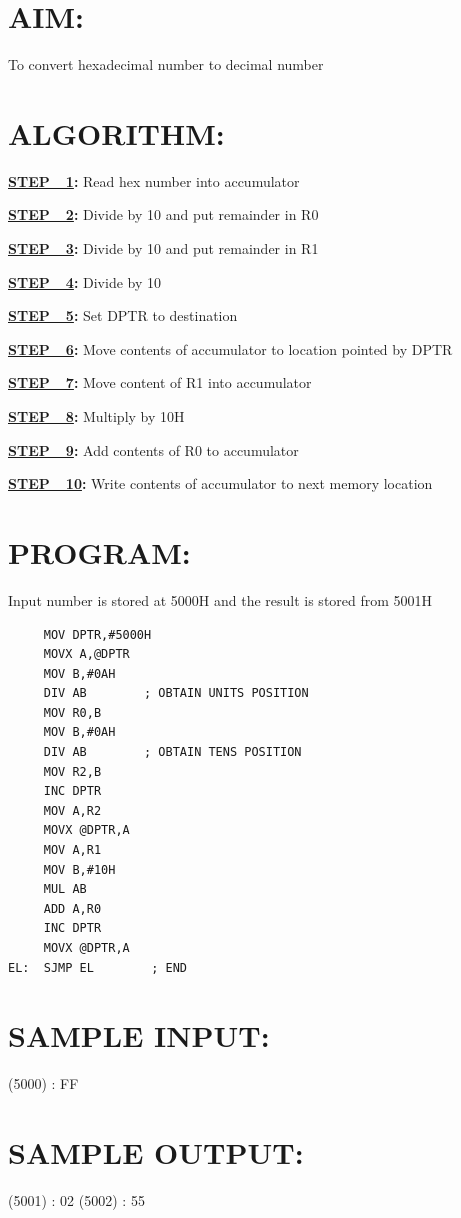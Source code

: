 \documentclass[a4paper,28pt]{report}
\begin{document}
\section*{AIM:}
To convert hexadecimal number to decimal number

\section*{ALGORITHM:}
\textbf{\underline{STEP\ \ 1}:} Read hex number into accumulator

\textbf{\underline{STEP\ \ 2}:} Divide by 10 and put remainder in R0

\textbf{\underline{STEP\ \ 3}:} Divide by 10 and put remainder in R1

\textbf{\underline{STEP\ \ 4}:} Divide by 10

\textbf{\underline{STEP\ \ 5}:} Set DPTR to destination

\textbf{\underline{STEP\ \ 6}:} Move contents of accumulator to location pointed by DPTR

\textbf{\underline{STEP\ \ 7}:} Move content of R1 into accumulator

\textbf{\underline{STEP\ \ 8}:} Multiply by 10H

\textbf{\underline{STEP\ \ 9}:} Add contents of R0 to accumulator

\textbf{\underline{STEP\ \ 10}:}   Write contents of accumulator to next memory location

\section*{PROGRAM:}
Input number is stored at 5000H and the result is stored from 5001H

\begin{lstlisting}
     MOV DPTR,#5000H
     MOVX A,@DPTR
     MOV B,#0AH
     DIV AB        ; OBTAIN UNITS POSITION
     MOV R0,B
     MOV B,#0AH
     DIV AB        ; OBTAIN TENS POSITION
     MOV R2,B
     INC DPTR
     MOV A,R2
     MOVX @DPTR,A
     MOV A,R1
     MOV B,#10H
     MUL AB
     ADD A,R0
     INC DPTR
     MOVX @DPTR,A
EL:  SJMP EL        ; END
\end{lstlisting}
\section*{SAMPLE INPUT:}
(5000) : FF
\section*{SAMPLE OUTPUT:}
(5001) : 02
(5002) : 55
\end{document}
